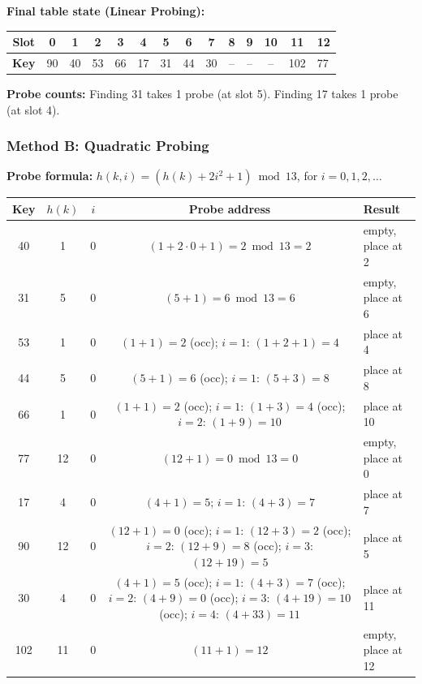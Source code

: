 \documentclass[12pt,portrait]{article}
\begin{document}
\textbf{Final table state (Linear Probing):}

\begingroup
\footnotesize
\setlength{\tabcolsep}{3pt}
\begin{center}
\begin{tabular}{c|c|c|c|c|c|c|c|c|c|c|c|c}
\toprule
\textbf{Slot} & 0 & 1 & 2 & 3 & 4 & 5 & 6 & 7 & 8 & 9 & 10 & 11 & 12 \\
\midrule
\textbf{Key} & 90 & 40 & 53 & 66 & 17 & 31 & 44 & 30 & -- & -- & -- & 102 & 77 \\
\bottomrule
\end{tabular}
\end{center}
\endgroup

\textbf{Probe counts:} Finding 31 takes 1 probe (at slot 5). Finding 17 takes 1 probe (at slot 4).

\subsubsection{Method B: Quadratic Probing}

\textbf{Probe formula:} $h(k, i) = (h(k) + 2i^2 + 1) \bmod 13$, for $i = 0, 1, 2, \ldots$

{\small
\begin{center}
\begin{tabular}{c|c|c|c|l}
\toprule
\textbf{Key} & $h(k)$ & $i$ & \textbf{Probe address} & \textbf{Result} \\
\midrule
40 & 1 & 0 & $(1+2\cdot0+1)=2\bmod13=2$ & empty, place at 2 \\
31 & 5 & 0 & $(5+1)=6\bmod13=6$ & empty, place at 6 \\
53 & 1 & 0 & $(1+1)=2$ (occ); $i=1$: $(1+2+1)=4$ & place at 4 \\
44 & 5 & 0 & $(5+1)=6$ (occ); $i=1$: $(5+3)=8$ & place at 8 \\
66 & 1 & 0 & $(1+1)=2$ (occ); $i=1$: $(1+3)=4$ (occ); $i=2$: $(1+9)=10$ & place at 10 \\
77 & 12 & 0 & $(12+1)=0\bmod13=0$ & empty, place at 0 \\
17 & 4 & 0 & $(4+1)=5$; $i=1$: $(4+3)=7$ & place at 7 \\
90 & 12 & 0 & $(12+1)=0$ (occ); $i=1$: $(12+3)=2$ (occ); $i=2$: $(12+9)=8$ (occ); $i=3$: $(12+19)=5$ & place at 5 \\
30 & 4 & 0 & $(4+1)=5$ (occ); $i=1$: $(4+3)=7$ (occ); $i=2$: $(4+9)=0$ (occ); $i=3$: $(4+19)=10$ (occ); $i=4$: $(4+33)=11$ & place at 11 \\
102 & 11 & 0 & $(11+1)=12$ & empty, place at 12 \\
\bottomrule
\end{tabular}
\end{center}
}
\end{document}
